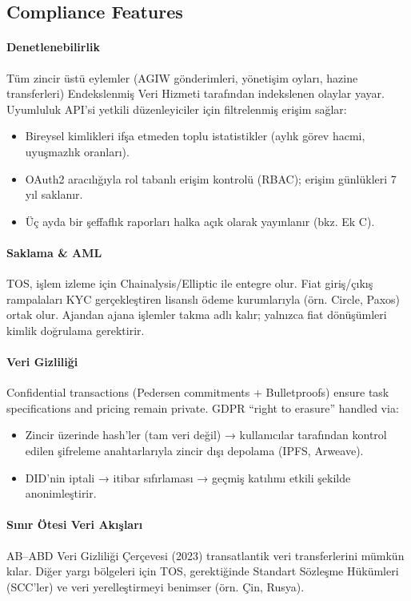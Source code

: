 \documentclass[11pt]{article}
\begin{document}
\begin{itemize}[noitemsep]
\begin{itemize}[noitemsep]
\begin{itemize}[noitemsep]
\begin{itemize}[noitemsep]
\begin{itemize}[noitemsep]
\begin{itemize}[noitemsep]
\begin{itemize}[noitemsep]
\begin{enumerate}[noitemsep]
\begin{itemize}[noitemsep]
\subsection{Compliance Features}

\paragraph{Denetlenebilirlik}
Tüm zincir üstü eylemler (AGIW gönderimleri, yönetişim oyları, hazine transferleri) Endekslenmiş Veri Hizmeti tarafından indekslenen olaylar yayar. Uyumluluk API'si yetkili düzenleyiciler için filtrelenmiş erişim sağlar:
\begin{itemize}[noitemsep]
  \item Bireysel kimlikleri ifşa etmeden toplu istatistikler (aylık görev hacmi, uyuşmazlık oranları).
  \item OAuth2 aracılığıyla rol tabanlı erişim kontrolü (RBAC); erişim günlükleri 7 yıl saklanır.
  \item Üç ayda bir şeffaflık raporları halka açık olarak yayınlanır (bkz. Ek C).
\end{itemize}

\paragraph{Saklama \& AML}
TOS, işlem izleme için Chainalysis/Elliptic ile entegre olur. Fiat giriş/çıkış rampalaları KYC gerçekleştiren lisanslı ödeme kurumlarıyla (örn. Circle, Paxos) ortak olur. Ajandan ajana işlemler takma adlı kalır; yalnızca fiat dönüşümleri kimlik doğrulama gerektirir.

\paragraph{Veri Gizliliği}
Confidential transactions (Pedersen commitments + Bulletproofs) ensure task specifications and pricing remain private. GDPR ``right to erasure'' handled via:
\begin{itemize}[noitemsep]
  \item Zincir üzerinde hash'ler (tam veri değil) → kullanıcılar tarafından kontrol edilen şifreleme anahtarlarıyla zincir dışı depolama (IPFS, Arweave).
  \item DID'nin iptali → itibar sıfırlaması → geçmiş katılımı etkili şekilde anonimleştirir.
\end{itemize}

\paragraph{Sınır Ötesi Veri Akışları}
AB--ABD Veri Gizliliği Çerçevesi (2023) transatlantik veri transferlerini mümkün kılar. Diğer yargı bölgeleri için TOS, gerektiğinde Standart Sözleşme Hükümleri (SCC'ler) ve veri yerelleştirmeyi benimser (örn. Çin, Rusya).


\end{itemize}
\end{enumerate}
\end{itemize}
\end{itemize}
\end{itemize}
\end{itemize}
\end{itemize}
\end{itemize}
\end{itemize}
\end{document}

